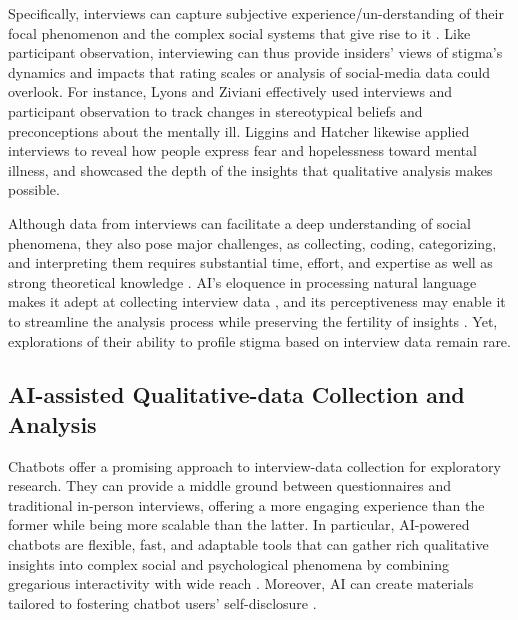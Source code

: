 Specifically, interviews can capture subjective experience/un-derstanding of their focal phenomenon and the complex social systems that give rise to it \cite{interview_stigma_measure_liggins_2005, interview_stigma_measure_lyons_1995}.
Like participant observation, interviewing can thus provide insiders' views of stigma's dynamics and impacts that rating scales or analysis of social-media data could overlook. 
For instance, Lyons and Ziviani \cite{interview_stigma_measure_lyons_1995} effectively used interviews and participant observation to track changes in stereotypical beliefs and preconceptions about the mentally ill. 
Liggins and Hatcher \cite{interview_stigma_measure_liggins_2005} likewise applied interviews to reveal how people express fear and hopelessness toward mental illness, and showcased the depth of the insights that qualitative analysis makes possible.



Although data from interviews can facilitate a deep understanding of social phenomena, they also pose major challenges, as collecting, coding, categorizing, and interpreting them requires substantial time, effort, and expertise \cite{human_coding_bias_leeson_2019} as well as strong theoretical knowledge \cite{coding_manual_saldana_2016}. 
AI's eloquence in processing natural language makes it adept at collecting interview data \cite{chatbot_kim_2019}, and its perceptiveness may enable it to streamline the analysis process while preserving the fertility of insights \cite{deductive_labelling_xiao_2023}. 
Yet, explorations of their ability to profile stigma based on interview data remain rare.




\subsection{AI-assisted Qualitative-data Collection and Analysis} %


Chatbots \cite{chatbot_hoque_2024} offer a promising approach to interview-data collection for exploratory research. 
They can provide a middle ground between questionnaires and traditional in-person interviews, offering a more engaging experience \cite{chatbot_kim_2019} than the former while being more scalable than the latter. 
In particular, AI-powered chatbots are flexible, fast, and adaptable tools that can gather rich qualitative insights into complex social and psychological phenomena by combining gregarious interactivity with wide reach \cite{chatbot_xiao_2020}. 
Moreover, AI can create materials tailored to fostering chatbot users' self-disclosure \cite{disclosure_lee_2022}.




